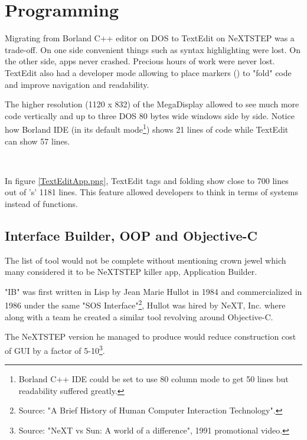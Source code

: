 \vspace{-10pt}
\section{Programming}
Migrating from Borland C++ editor on DOS to TextEdit on NeXTSTEP was a trade-off. On one side convenient things such as syntax highlighting were lost. On the other side, apps never crashed. Precious hours of work were never lost. TextEdit also had a developer mode allowing to place markers (\cw{//}) to "fold" code and improve navigation and readability.\\
\par
 The higher resolution (1120 x 832) of the MegaDisplay allowed to see much more code vertically and up to three DOS 80 bytes wide windows side by side. Notice how Borland IDE (in its default mode\footnote{Borland C++ IDE could be set to use 80 column mode to get 50 lines but readability suffered greatly.}) shows 21 lines of code while TextEdit can show 57 lines.\\
\par
{}\\

\vspace{-4mm}


In figure \ref{TextEditApp.png}, TextEdit tags and folding show close to 700 lines out of 's' 1181 lines. This feature allowed developers to think in terms of systems instead of functions.

\subsection{Interface Builder, OOP and Objective-C}
The list of tool would not be complete without mentioning \NeXT crown jewel which many considered it to be NeXTSTEP killer app, Application Builder.\\
\par
"IB" was first written in Lisp by Jean Marie Hullot in 1984 and commercialized in 1986 under the same "SOS Interface"\footnote{Source: "A Brief History of Human Computer Interaction Technology".}, Hullot was hired by NeXT, Inc. where along with a team he created a similar tool revolving around Objective-C.\\
\par
The NeXTSTEP version he managed to produce would reduce construction cost of GUI by a factor of 5-10\footnote{Source: "NeXT vs Sun: A world of a difference", 1991 promotional video.}.\\
\par
{}



